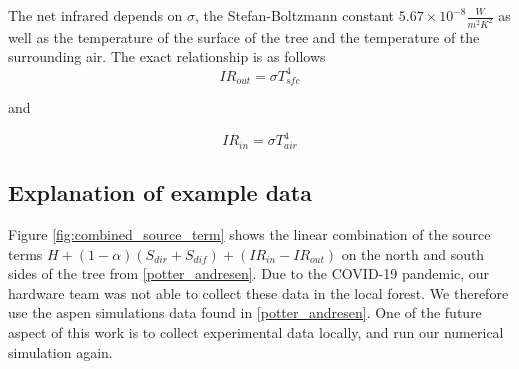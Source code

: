 \documentclass{IEEEtran} %
\begin{document}
The net infrared depends on $\sigma$, the Stefan-Boltzmann constant $5.67\times 10^{-8} \frac{W}{m^2K^2}$ as well as the temperature of the surface of the tree and the temperature of the surrounding air. The exact relationship is as follows
\begin{equation}
IR_{out} = \sigma T_{sfc}^4
\end{equation}

and

\begin{equation}
IR_{in} = \sigma T_{air}^4
\end{equation}


\subsection{Explanation of example data}

Figure \ref{fig:combined_source_term} shows the linear combination of the source terms $H + (1-\alpha)(S_{dir}+S_{dif})+(IR_{in}-IR_{out})$ on the north and south sides of the tree from \ref{potter_andresen}. 
Due to the COVID-19 pandemic, our hardware team was not able to collect these data in the local forest. We therefore use the aspen simulations data found in \ref{potter_andresen}. One of the future aspect of this work is to collect experimental data locally, and run our numerical simulation again.
\end{document}
